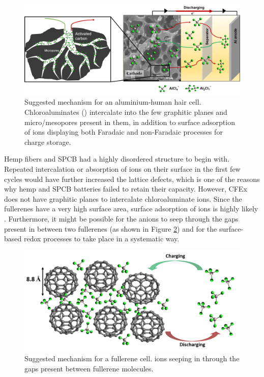 \documentclass{article}
\begin{document}
 \begin{figure}[h!]
  \centering
  \includegraphics[width=\textwidth]{fig/ACHmech}
    \caption{Suggested mechanism for an aluminium-human hair cell. Chloroaluminates () intercalate into the few graphitic planes and micro/mesopores present in them, in addition to surface adsorption of ions displaying both Faradaic and non-Faradaic processes for charge storage.}
  \label{fig:ACHmech}
\end{figure}

Hemp fibers and SPCB had a highly disordered structure to begin with. Repeated intercalation or absorption of ions on their surface in the first few cycles would have further increased the lattice defects, which is one of the reasons why hemp and SPCB batteries failed to retain their capacity. However, CFEx does not have graphitic planes to intercalate chloroaluminate ions. Since the fullerenes have a very high surface area, surface adsorption of ions is highly likely \cite{adams_van_1994}. Furthermore, it might be possible for the anions to seep through the gaps present in between two fullerenes (as shown in Figure \ref{fig:CFExmech}) and for the surface-based redox processes to take place in a systematic way.

 \begin{figure}[tbh!]
  \centering
  \includegraphics[width=\textwidth]{fig/CFExmech}
    \caption{Suggested mechanism for a fullerene cell.  ions seeping in through the gaps present between fullerene molecules.}
  \label{fig:CFExmech}
\end{figure}
\end{document}
